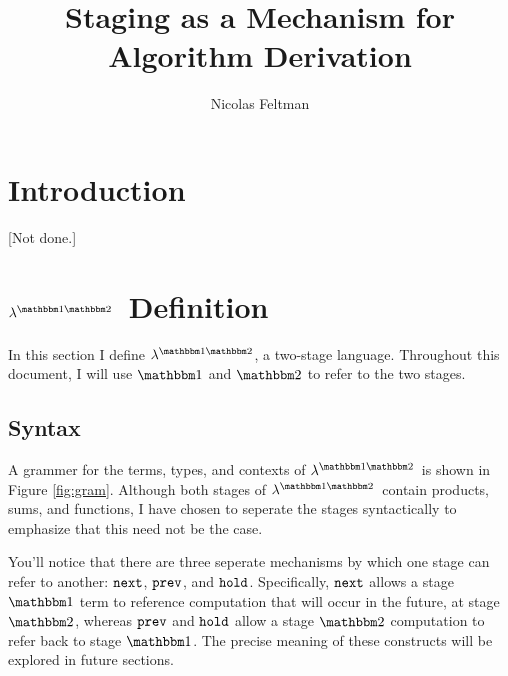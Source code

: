 \documentclass[11pt]{article}
\title{\Large\textbf{Staging as a Mechanism for Algorithm Derivation}}
\author{Nicolas Feltman}
\newcommand {\bbone} {\mathbbm 1}
\newcommand {\bbtwo} {\mathbbm 2}
\newcommand {\pause} {{\tt hold}}
\newcommand {\next} {{\tt next}}
\newcommand {\prev} {{\tt prev}}
\newcommand {\lang} {$\lambda^{\bbone\bbtwo}$}
\begin{document}
\maketitle

\section{Introduction}

[Not done.]

\section{\lang~Definition}
\label{sec:def}

In this section I define \lang, a two-stage language.  Throughout this document, I will use $\bbone$ and $\bbtwo$ to refer to the two stages.  

\subsection{Syntax}

A grammer for the terms, types, and contexts of \lang\ is shown in Figure \ref{fig:gram}.  Although both stages of \lang\ contain products, sums, and functions, I have chosen to seperate the stages syntactically to emphasize that this need not be the case.

You'll notice that there are three seperate mechanisms by which one stage can refer to another: $\next$, $\prev$, and $\pause$.  Specifically, $\next$ allows a stage $\bbone$ term to reference computation that will occur in the future, at stage $\bbtwo$, whereas $\prev$ and $\pause$ allow a stage $\bbtwo$ computation to refer back to stage $\bbone$.  The precise meaning of these constructs will be explored in future sections.
\end{document}
